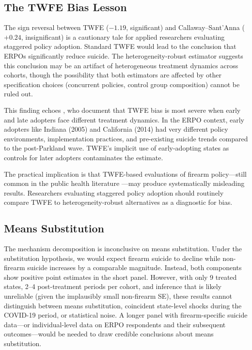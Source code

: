 \documentclass[12pt]{article}
\begin{document}
\subsection{The TWFE Bias Lesson}

The sign reversal between TWFE ($-1.19$, significant) and Callaway--Sant'Anna ($+0.24$, insignificant) is a cautionary tale for applied researchers evaluating staggered policy adoption. Standard TWFE would lead to the conclusion that ERPOs significantly reduce suicide. The heterogeneity-robust estimator suggests this conclusion may be an artifact of heterogeneous treatment dynamics across cohorts, though the possibility that both estimators are affected by other specification choices (concurrent policies, control group composition) cannot be ruled out.

This finding echoes \citet{roth2023s}, who document that TWFE bias is most severe when early and late adopters face different treatment dynamics. In the ERPO context, early adopters like Indiana (2005) and California (2014) had very different policy environments, implementation practices, and pre-existing suicide trends compared to the post-Parkland wave. TWFE's implicit use of early-adopting states as controls for later adopters contaminates the estimate.

The practical implication is that TWFE-based evaluations of firearm policy---still common in the public health literature \citep{kivisto2018firearm}---may produce systematically misleading results. Researchers evaluating staggered policy adoption should routinely compare TWFE to heterogeneity-robust alternatives as a diagnostic for bias.

\subsection{Means Substitution}

The mechanism decomposition is inconclusive on means substitution. Under the substitution hypothesis, we would expect firearm suicide to decline while non-firearm suicide increases by a comparable magnitude. Instead, both components show positive point estimates in the short panel. However, with only 9 treated states, 2--4 post-treatment periods per cohort, and inference that is likely unreliable (given the implausibly small non-firearm SE), these results cannot distinguish between means substitution, coincident state-level shocks during the COVID-19 period, or statistical noise. A longer panel with firearm-specific suicide data---or individual-level data on ERPO respondents and their subsequent outcomes---would be needed to draw credible conclusions about means substitution.
\end{document}
